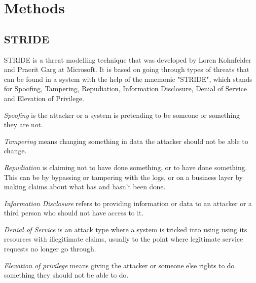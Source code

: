 \chapter{Methods}
\label{chapter:methods}


\newpage

\section{STRIDE}

STRIDE is a threat modelling technique that was developed by Loren Kohnfelder and Praerit Garg at Microsoft. 
It is based on going through types of threats that can be found in a system with the help of the mnemonic "STRIDE", which stands for Spoofing, Tampering, Repudiation, Information Disclosure, Denial of Service and Elevation of Privilege. \cite{threat_modeling_book}

\emph{Spoofing} is the attacker or a system is pretending to be someone or something they are not. 

\emph{Tampering} means changing something in data the attacker should not be able to change.

\emph{Repudiation} is claiming not to have done something, or to have done something.
This can be by bypassing or tampering with the logs, or on a business layer by making claims about what has and hasn't been done.

\emph{Information Disclosure} refers to providing information or data to an attacker or a third person who should not have access to it.

\emph{Denial of Service} is an attack type where a system is tricked into using using its resources with illegitimate claims, usually to the point where legitimate service requests no longer go through.

\emph{Elevation of privilege} means giving the attacker or someone else rights to do something they should not be able to do.

